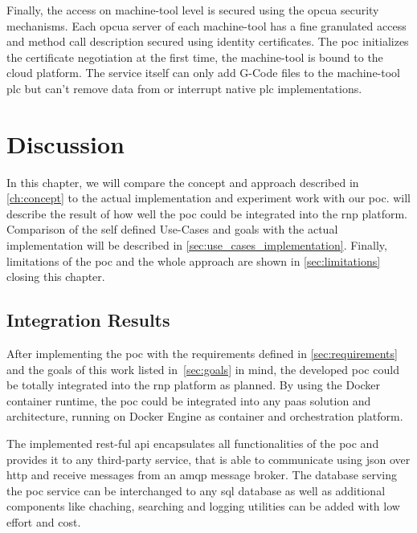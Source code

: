 \documentclass[
a4paper,
twoside,
headsepline,
cleardoublepage=empty,
parskip=half,
draft=false
]{scrbook}
\begin{document}
				Finally, the access on machine-tool level is secured using the \gls{opcua} security mechanisms. Each \gls{opcua} server of each machine-tool has a fine granulated access and method call description secured using identity certificates. The \gls{poc} initializes the certificate negotiation at the first time, the machine-tool is bound to the cloud platform. The service itself can only add G-Code files to the machine-tool \gls{plc} but can't remove data from or interrupt native \gls{plc} implementations.

	\chapter{Discussion} \label{ch:discusion}

		In this chapter, we will compare the concept and approach described in \cref{ch:concept} to the actual implementation and experiment work with our \gls{poc}.  will describe the result of how well the \gls{poc} could be integrated into the \gls{rnp} platform. Comparison of the self defined Use-Cases and goals with the actual implementation will be described in \cref{sec:use_cases_implementation}. Finally, limitations of the \gls{poc} and the whole approach are shown in \cref{sec:limitations} closing this chapter.

		\section{Integration Results}\label{sec:integration_results}

			After implementing the \gls{poc} with the requirements defined in \cref{sec:requirements} and the goals of this work listed in~\cref{sec:goals} in mind, the developed \gls{poc} could be totally integrated into the \gls{rnp} platform as planned. By using the Docker container runtime, the \gls{poc} could be integrated into any \gls{paas} solution and architecture, running on Docker Engine as container and orchestration platform.

			The implemented \gls{rest}-ful \gls{api} encapsulates all functionalities of the \gls{poc} and provides it to any third-party service, that is able to communicate using \gls{json} over \gls{http} and receive messages from an \gls{amqp} message broker. The database serving the \gls{poc} service can be interchanged to any \gls{sql} database as well as additional components like chaching, searching and logging utilities can be added with low effort and cost.
\end{document}
